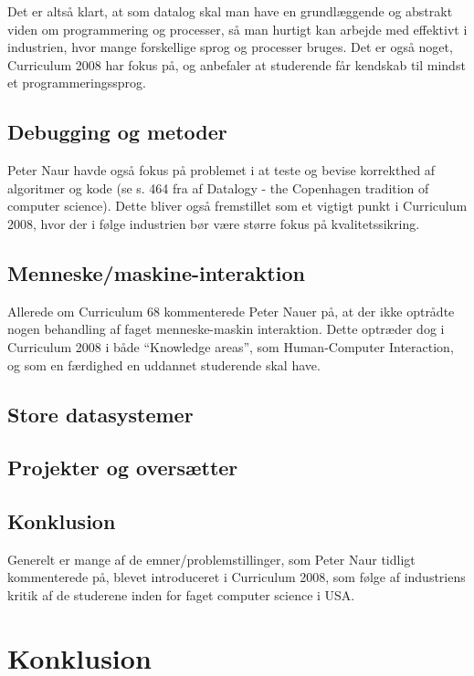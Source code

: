 \documentclass[10pt,a4paper]{article}
\begin{document}
Det er altså klart, at som datalog skal man have en grundlæggende og abstrakt viden om programmering og processer, så man hurtigt kan arbejde med effektivt i industrien, hvor mange forskellige sprog og processer bruges. Det er også noget, Curriculum 2008 har fokus på, og anbefaler at studerende får kendskab til mindst et programmeringssprog.

\subsection{Debugging og metoder}
Peter Naur havde også fokus på problemet i at teste og bevise korrekthed af algoritmer og kode (se s. 464 fra af Datalogy - the Copenhagen tradition of computer science). Dette bliver også fremstillet som et vigtigt punkt i Curriculum 2008, hvor der i følge industrien bør være større fokus på kvalitetssikring. 

\subsection{Menneske/maskine-interaktion}
Allerede om Curriculum 68 kommenterede Peter Nauer på, at der ikke optrådte nogen behandling af faget menneske-maskin interaktion. Dette optræder dog i Curriculum 2008 i både ``Knowledge areas'', som Human-Computer Interaction, og som en færdighed en uddannet studerende skal have.

\subsection{Store datasystemer}


\subsection{Projekter og oversætter}


\subsection{Konklusion}
Generelt er mange af de emner/problemstillinger, som Peter Naur tidligt kommenterede på, blevet introduceret i Curriculum 2008, som følge af industriens kritik af de studerene inden for faget computer science i USA.


\section{Konklusion}
\end{document}

